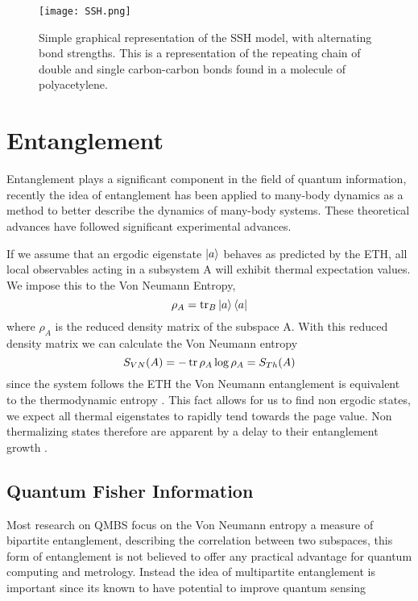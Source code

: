\begin{figure}
	\centering
	\texttt{[image: SSH.png]}
	\caption{Simple graphical representation of the SSH model, with alternating bond strengths. This is a representation of the repeating chain of double and single carbon-carbon bonds found in a molecule of polyacetylene.}
	\label{fig:fig_SSH}
\end{figure}

\section{Entanglement}

Entanglement plays a significant component in the field of quantum information, recently the idea of entanglement has  been applied to many-body dynamics as a method to better describe the dynamics of many-body systems. These theoretical advances have followed significant experimental advances. 

If we assume that an ergodic eigenstate $\ket{a}$ behaves as predicted by the ETH, all local observables acting in a subsystem A will exhibit thermal expectation values. We impose this to the Von Neumann Entropy,
\begin{equation}\label{eq:partialtrace}
\rho_A = \tr_B \ket{a}\bra{a}
\end{equation}
where $\rho_A $ is the reduced density matrix of the subspace A. With this reduced density matrix we can calculate the Von Neumann entropy 
\begin{equation}\label{VNE}
S_{VN}(A) = -\tr \rho_A \log \rho_A =S_{Th}(A)
\end{equation}
 since the system follows the ETH the Von Neumann entanglement is equivalent to the thermodynamic entropy\cite{nandkishore_many-body_2015} \citep{nielsen_chuang_2010}. 
This fact allows for us to find non ergodic states, we expect all thermal eigenstates to rapidly tend towards the page value. Non thermalizing states therefore are apparent by a delay to their entanglement growth \citep{abanin_colloquium_2019}.
\subsection{Quantum Fisher Information}
Most research on QMBS focus on the Von Neumann entropy a measure of bipartite entanglement, describing the correlation between two subspaces, this form of entanglement is not believed to offer any practical advantage for quantum computing and metrology. Instead the idea of multipartite entanglement is important since its known to have potential to improve quantum sensing \citep{pezze2014quantum}